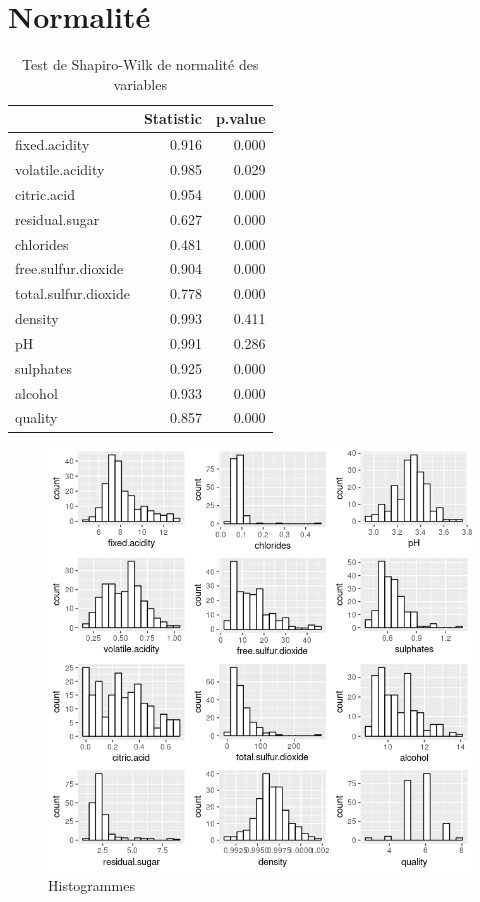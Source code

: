 \documentclass[11pt,a4paper]{article}
\begin{document}
\section{Normalité}
\label{sec:normalite}
\begin{table}[ht]
	\centering
	\begin{tabular}{lrr}
		\hline
		& Statistic & p.value \\ 
		\hline
		fixed.acidity & 0.916 & 0.000 \\ 
		volatile.acidity & 0.985 & 0.029 \\ 
		citric.acid & 0.954 & 0.000 \\ 
		residual.sugar & 0.627 & 0.000 \\ 
		chlorides & 0.481 & 0.000 \\ 
		free.sulfur.dioxide & 0.904 & 0.000 \\ 
		total.sulfur.dioxide & 0.778 & 0.000 \\ 
		density & 0.993 & 0.411 \\ 
		pH & 0.991 & 0.286 \\ 
		sulphates & 0.925 & 0.000 \\ 
		alcohol & 0.933 & 0.000 \\ 
		quality & 0.857 & 0.000 \\ 
		\hline
	\end{tabular}
\caption{Test de Shapiro-Wilk de normalité des variables}
\label{table:shapiro}
\end{table}
\begin{figure}

\includegraphics[width=\textwidth,keepaspectratio]{"histogram"}

\caption{Histogrammes}
\label{fig:histo}
\end{figure}
\end{document}
